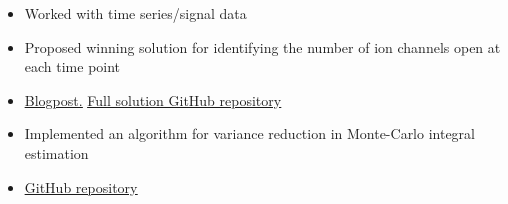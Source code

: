 

\begin{itemize}
	\item Worked with time series/signal data
	\item Proposed winning solution for identifying the number of ion channels open at each time point
	\item \href{https://www.kaggle.com/c/liverpool-ion-switching/discussion/153991}{\underline{Blogpost.}} \href{https://github.com/stdereka/liverpool-ion-switching}{\underline{Full solution GitHub repository}}
\end{itemize}

\divider

\begin{itemize}
	\item Implemented an algorithm for variance reduction in Monte-Carlo integral estimation
	\item \href{https://github.com/stdereka/MAP361P}{\underline{GitHub repository}}
\end{itemize}


